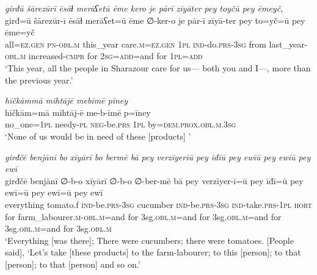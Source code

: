 \ea \label{PM.38}
\textit{girđū šārezūrī ēsāɫ merāʕetū ēme kero je pārī zīyāter pey toyčū pey ēmeyč,} \\ 
\gll girđ=ū šārezūr-ī ēsāɫ merāʕet=ū ēme ∅-ker-o je pār-ī zīyā-ter pey to=yč=ū pey ēme=yč \\ 
 all\textsc{\textsc{=ez.gen}} \textsc{pn}\textsc{-obl}\textsc{.m} this\_year care\textsc{.m}\textsc{\textsc{=ez.gen}} \textsc{1pl} \textsc{ind-}do\textsc{.prs}\textsc{-3sg} from last\_year\textsc{-obl}\textsc{.m} increased\textsc{-cmpr} for \textsc{2sg}\textsc{=add}=and for \textsc{1pl}\textsc{=add} \\ 
\glt `This year, all the people in Sharazour care for us— both you and I—, more than the previous year.'
\z 
 
\ea \label{PM.39}
\textit{hīčkāmmā mihtājē mebīmē pīney} \\ 
\gll hīčkām=mā mihtāj-ē me-b-īmē p=īney \\ 
 no\_one\textsc{=1pl} needy\textsc{\textsc{-pl}} \textsc{neg-}be\textsc{.prs} \textsc{1pl} by=\textsc{dem.prox}\textsc{.obl}\textsc{.m}\textsc{.3sg} \\ 
\glt `None of us would be in need of these [products] '
\z 
 
\ea \label{PM.43}
\textit{girđčē benjānī bo xīyārī bo bermē bā pey verzīyerīū pey īđīū pey ewīū pey ewīū pey ewī} \\ 
\gll girđčē benjānī ∅-b-o xīyārī ∅-b-o ∅-ber-mē bā pey verzīyer-ī=ū pey īđī=ū pey ewī=ū pey ewī=ū pey ewī \\ 
 everything tomato.f \textsc{ind-}be\textsc{.prs}\textsc{-3sg} cucumber \textsc{ind-}be\textsc{.prs}\textsc{-3sg} \textsc{ind-}take\textsc{.prs}\textsc{-1pl} \textsc{hort} for farm\_labourer\textsc{.m}\textsc{-obl}\textsc{.m}=and for 3sg\textsc{.obl}\textsc{.m}=and for 3sg\textsc{.obl}\textsc{.m}=and for 3sg\textsc{.obl}\textsc{.m}=and for 3sg\textsc{.obl}\textsc{.m} \\ 
\glt `Everything [was there]; There were cucumbers; there were tomatoes. [People said], ‘Let’s take [these products] to the farm-labourer; to this [person]; to that [person]; to that [person] and so on.'
\z 
 
